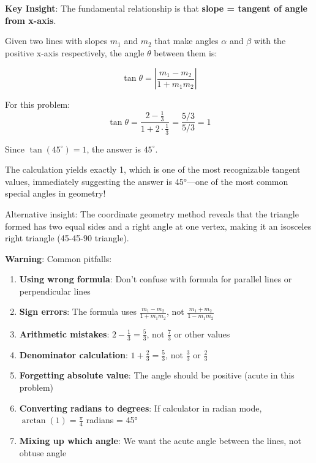 \documentclass[12pt]{article}
\begin{document}
\begin{keyinsightbox}
\textbf{Key Insight}: The fundamental relationship is that \textbf{slope = tangent of angle from x-axis}.

Given two lines with slopes $m_1$ and $m_2$ that make angles $\alpha$ and $\beta$ with the positive x-axis respectively, the angle $\theta$ between them is:

$$\tan\theta = \left|\frac{m_1 - m_2}{1 + m_1 m_2}\right|$$

For this problem:
$$\tan\theta = \frac{2 - \frac{1}{3}}{1 + 2 \cdot \frac{1}{3}} = \frac{5/3}{5/3} = 1$$

Since $\tan(45^\circ) = 1$, the answer is $45^\circ$.

The calculation yields exactly 1, which is one of the most recognizable tangent values, immediately suggesting the answer is 45°—one of the most common special angles in geometry!

Alternative insight: The coordinate geometry method reveals that the triangle formed has two equal sides and a right angle at one vertex, making it an isosceles right triangle (45-45-90 triangle).
\end{keyinsightbox}

\begin{warningbox}
\textbf{Warning}: Common pitfalls:
\begin{enumerate}
    \item \textbf{Using wrong formula}: Don't confuse with formula for parallel lines or perpendicular lines
    \item \textbf{Sign errors}: The formula uses $\frac{m_1 - m_2}{1 + m_1 m_2}$, not $\frac{m_1 + m_2}{1 - m_1 m_2}$
    \item \textbf{Arithmetic mistakes}: $2 - \frac{1}{3} = \frac{5}{3}$, not $\frac{7}{3}$ or other values
    \item \textbf{Denominator calculation}: $1 + \frac{2}{3} = \frac{5}{3}$, not $\frac{3}{3}$ or $\frac{2}{3}$
    \item \textbf{Forgetting absolute value}: The angle should be positive (acute in this problem)
    \item \textbf{Converting radians to degrees}: If calculator in radian mode, $\arctan(1) = \frac{\pi}{4}$ radians = 45°
    \item \textbf{Mixing up which angle}: We want the acute angle between the lines, not obtuse angle
\end{enumerate}
\end{warningbox}
\end{document}
